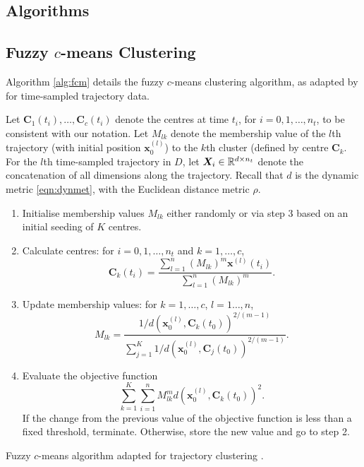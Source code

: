 \documentclass[a4paper, fontsize=12pt]{article}
\begin{document}
\clearpage




\clearpage

\begin{appendices}
\section{Algorithms}

\subsection{Fuzzy \(c\)-means Clustering}\label{app:fcm}
Algorithm \ref{alg:fcm} details the fuzzy \(c\)-means clustering algorithm, as adapted  by \cite{froyland_2015_fuzzy} for time-sampled trajectory data.

\begin{algorithm}[H]
Let \(\bm{C}_1(t_i), \hdots, \bm{C}_c(t_i)\) denote the centres at time \(t_i\), for \(i = 0,1,\hdots, n_t\), to be consistent with our notation. Let \(M_{lk}\) denote the membership value of the \(l\)th trajectory (with initial position \(\bm{x}_0^{(l)}\)) to the \(k\)th cluster (defined by centre \(\bm{C}_k\). For the \(l\)th time-sampled trajectory in \(D\), let \(\bm{X}_i \in \mathbb{R}^{d\times n_t}\) denote the concatenation of all dimensions along the trajectory. Recall that \(d\) is the dynamic metric \eqref{eqn:dynmet}, with the Euclidean distance metric \(\rho\).
\begin{enumerate}
\item Initialise membership values \(M_{lk}\) either randomly or via step 3 based on an initial seeding of \(K\) centres.
\item Calculate centres: for \(i = 0,1,\hdots, n_t\) and \(k = 1,\hdots,c\),
\[
\bm{C}_k(t_i) = \frac{\sum_{l=1}^{n}{\left(M_{lk}\right)^m \bm{x}^{(l)}\left(t_i\right)}}{\sum_{l=1}^n{\left(M_{lk}\right)^m}}.
\]
\item Update membership values: for \(k = 1,\hdots,c\), \(l = 1\hdots,n\),
\[
M_{lk} = \frac{1/d\left(\bm{x}^{(l)}_0, \bm{C}_k(t_0)\right)^{2/(m-1)}}{\sum_{j=1}^{K}{1/d\left(\bm{x}^{(l)}_0, \bm{C}_j(t_0)\right)^{2/(m-1)}}}.
\]

\item Evaluate the objective function
\[
\sum_{k=1}^{K}{\sum_{i=1}^{n}{M_{lk}^m d\left(\bm{x}_0^{(l)},\bm{C}_k(t_0)\right)^2}}.
\]
If the change from the previous value of the objective function is less than a fixed threshold, terminate. Otherwise, store the new value and go to step 2.
\end{enumerate}
\caption{Fuzzy \(c\)-means algorithm adapted for trajectory clustering \cite{froyland_2015_fuzzy}.}
\label{alg:fcm}
\end{algorithm}


\end{appendices}
\end{document}
